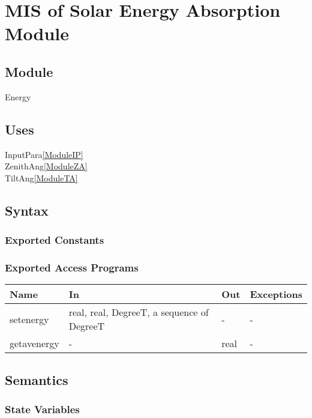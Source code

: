 \documentclass[12pt, titlepage]{article}
\begin{document}
\section{MIS of Solar Energy Absorption Module} \label{ModuleE} 

\subsection{Module}
Energy

\subsection{Uses}
InputPara\ref{ModuleIP}\\
ZenithAng\ref{ModuleZA}\\ 
TiltAng\ref{ModuleTA}

\subsection{Syntax}

\subsubsection{Exported Constants}


\subsubsection{Exported Access Programs}

\begin{center}
\begin{tabular}{p{2cm} p{5cm} p{4cm} p{1cm}}
\hline
\textbf{Name} & \textbf{In} & \textbf{Out} & \textbf{Exceptions} \\
\hline 
setenergy & real, real, DegreeT, a sequence of DegreeT & - & - \\
getavenergy & - & real & - \\

\hline
\end{tabular}
\end{center}


\subsection{Semantics}

\subsubsection{State Variables}
\end{document}
